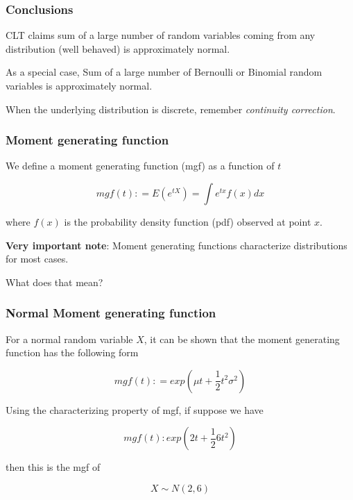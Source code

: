 \documentclass{beamer}\usepackage[]{graphicx}\usepackage[]{color}
\begin{document}
\begin{frame}[fragile]

\frametitle{Conclusions}

CLT claims sum of a large number of random variables coming from any distribution (well behaved) is approximately normal. \pause \newline

As a special case, Sum of a large number of Bernoulli or Binomial random variables is approximately normal. \pause \newline

When the underlying distribution is discrete, remember \textit{continuity correction}.

\end{frame}

\begin{frame}[fragile]

\frametitle{Moment generating function}

We define a moment generating function (mgf) as a function of $t$ 

$$ mgf(t) : = E \left (e^{tX} \right)  = \int e^{tx} f(x) dx $$

where $f(x)$ is the probability density function (pdf) observed at point $x$. \pause \newline

\textbf{Very important note}: Moment generating functions characterize distributions for most cases. \pause \newline

What does that mean? \pause \newline

\end{frame}

\begin{frame}[fragile]

\frametitle{Normal Moment generating function}

For a normal random variable $X$, it can be shown that the moment generating function has the following form 

$$ mgf(t) : = exp \left (\mu t + \frac{1}{2} t^2 \sigma^2 \right ) $$

Using the characterizing property of mgf, if suppose we have 

$$ mgf(t): exp \left (2 t + \frac{1}{2} 6t^2\right ) $$

then this is the mgf of 

$$ X \sim N(2,6) $$

\end{frame}
\end{document}
